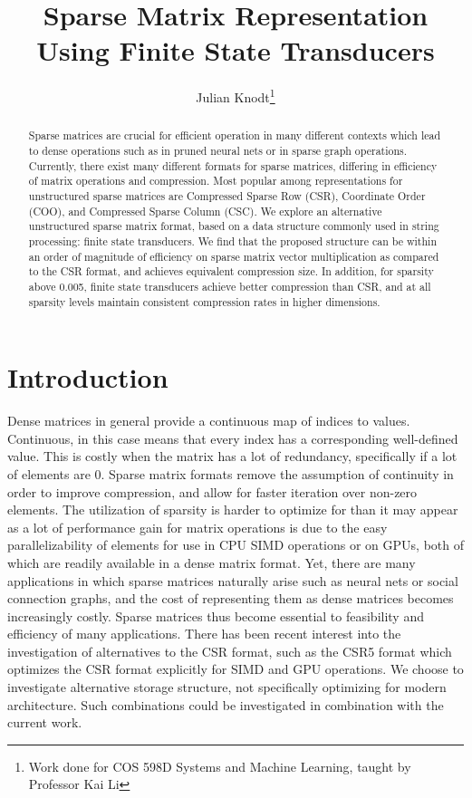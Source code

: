 \documentclass[12pt]{article}
\title{\vspace{-1cm}Sparse Matrix Representation Using Finite State Transducers}
\author{\vspace{-1cm}Julian Knodt\thanks{Work done for COS 598D Systems and Machine Learning, taught by Professor Kai Li}}
\begin{document}
\maketitle

\begin{abstract}
Sparse matrices are crucial for efficient operation in many different contexts which lead to
dense operations such as in pruned neural nets or in sparse graph operations. Currently, there
exist many different formats for sparse matrices, differing in efficiency of matrix operations
and compression. Most popular among representations for unstructured sparse matrices are
Compressed Sparse Row (CSR), Coordinate Order (COO), and Compressed Sparse Column (CSC). We explore
an alternative unstructured sparse matrix format, based on a data structure commonly used in
string processing: finite state transducers. We find that the proposed structure can be within
an order of magnitude of efficiency on sparse matrix vector multiplication as compared to the
CSR format, and achieves equivalent compression size. In addition, for sparsity above 0.005,
finite state transducers achieve better compression than CSR, and at all sparsity levels maintain
consistent compression rates in higher dimensions.
\end{abstract}

\section{Introduction}
Dense matrices in general provide a continuous map of indices to values. Continuous, in this
case means that every index has a corresponding well-defined value. This is costly when the matrix has a
lot of redundancy, specifically if a lot of elements are $0$. Sparse matrix formats remove the assumption
of continuity in order to improve compression, and allow for faster iteration over non-zero
elements. The utilization of sparsity is harder to optimize for than it may appear as a lot of
performance gain for matrix operations is due to the easy parallelizability of elements for use
in CPU SIMD operations or on GPUs, both of which are readily available in a dense matrix
format. Yet, there are many applications in which sparse matrices naturally arise such as
neural nets or social connection graphs, and the cost of representing them as dense matrices
becomes increasingly costly. Sparse matrices thus become essential to feasibility and efficiency
of many applications. There has been recent interest into the investigation of alternatives to
the CSR format, such as the CSR5\cite{csr5} format which optimizes the CSR format explicitly for
SIMD and GPU operations. We choose to investigate alternative storage structure, not
specifically optimizing for modern architecture. Such combinations could be investigated in
combination with the current work.
\end{document}
